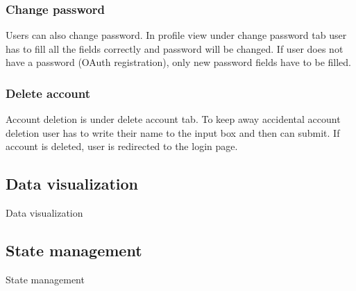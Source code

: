 \subsubsection{Change password}\label{subsubsec:change-password}
Users can also change password.
In profile view under change password tab user has to fill all the fields correctly and password will be changed.
If user does not have a password (OAuth registration), only new password fields have to be filled.

\subsubsection{Delete account}\label{subsubsec:delete-account}
Account deletion is under delete account tab.
To keep away accidental account deletion user has to write their name to the input box and then can submit.
If account is deleted, user is redirected to the login page.


\subsection{Data visualization}\label{subsec:data-visualization}
Data visualization

\subsection{State management}\label{subsec:state-management-content}
State management
